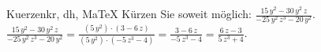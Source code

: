 \begin{MAufgabe}{Kuerzen}{kr, dh, MaTeX}
K\"urzen Sie soweit m\"oglich: $\frac{15\, y^2 - 30\, y^2\, z}{ - 25\, y^2\, z^3 - 20\, y^2}$.\\ 
\ifLsg\MLoesung
\quad $\frac{15\, y^2 - 30\, y^2\, z}{ - 25\, y^2\, z^3 - 20\, y^2}=\frac{(5\, y^2)\cdot(3 - 6\, z)}{(5\, y^2)\cdot( - 5\, z^3 - 4)}=\frac{3 - 6\, z}{ - 5\, z^3 - 4}=\frac{6\, z - 3}{5\, z^3 + 4}$.\else\relax\fi
 \end{MAufgabe}